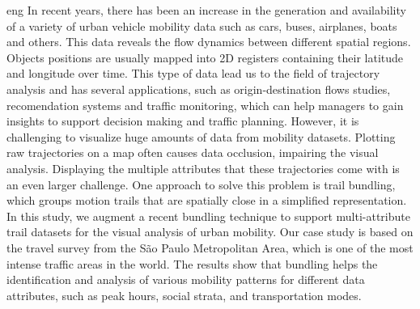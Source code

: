 \begin{resumo}{eng} 
In recent years, there has been an increase in the generation and availability
of a variety of urban vehicle mobility data such as cars, buses, airplanes,
boats and others.  This data reveals the flow dynamics between different spatial
regions. Objects positions are usually mapped into 2D registers containing their
latitude and longitude over time. This type of data lead us to the field of
trajectory analysis and has several applications, such as origin-destination
flows studies, recomendation systems and traffic monitoring, which can help
managers to gain insights to support decision making and traffic planning.
However, it is challenging to visualize huge amounts of data from mobility
datasets. Plotting raw trajectories on a map often causes data occlusion,
impairing the visual analysis. Displaying the multiple attributes that these
trajectories come with is an even larger challenge. One approach to solve this
problem is trail bundling, which groups motion trails that are spatially close
in a simplified representation. In this study, we augment a recent bundling
technique to support multi-attribute trail datasets for the visual analysis of
urban mobility. Our case study is based on the travel survey from the São Paulo
Metropolitan Area, which is one of the most intense traffic areas in the world.
The results show that bundling helps the identification and analysis of various
mobility patterns for different data attributes, such as peak hours, social
strata, and transportation modes.
\end{resumo}
